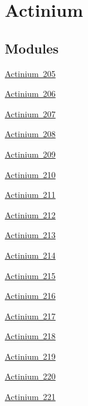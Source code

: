 \hypertarget{group___isotope_const-_actinium}{}\section{Actinium}
\label{group___isotope_const-_actinium}
\subsection*{Modules}
\begin{DoxyCompactItemize}
\item 
\mbox{\hyperlink{group___isotope_const-_actinium-_ac205}{Actinium 205}}
\item 
\mbox{\hyperlink{group___isotope_const-_actinium-_ac206}{Actinium 206}}
\item 
\mbox{\hyperlink{group___isotope_const-_actinium-_ac207}{Actinium 207}}
\item 
\mbox{\hyperlink{group___isotope_const-_actinium-_ac208}{Actinium 208}}
\item 
\mbox{\hyperlink{group___isotope_const-_actinium-_ac209}{Actinium 209}}
\item 
\mbox{\hyperlink{group___isotope_const-_actinium-_ac210}{Actinium 210}}
\item 
\mbox{\hyperlink{group___isotope_const-_actinium-_ac211}{Actinium 211}}
\item 
\mbox{\hyperlink{group___isotope_const-_actinium-_ac212}{Actinium 212}}
\item 
\mbox{\hyperlink{group___isotope_const-_actinium-_ac213}{Actinium 213}}
\item 
\mbox{\hyperlink{group___isotope_const-_actinium-_ac214}{Actinium 214}}
\item 
\mbox{\hyperlink{group___isotope_const-_actinium-_ac215}{Actinium 215}}
\item 
\mbox{\hyperlink{group___isotope_const-_actinium-_ac216}{Actinium 216}}
\item 
\mbox{\hyperlink{group___isotope_const-_actinium-_ac217}{Actinium 217}}
\item 
\mbox{\hyperlink{group___isotope_const-_actinium-_ac218}{Actinium 218}}
\item 
\mbox{\hyperlink{group___isotope_const-_actinium-_ac219}{Actinium 219}}
\item 
\mbox{\hyperlink{group___isotope_const-_actinium-_ac220}{Actinium 220}}
\item 
\mbox{\hyperlink{group___isotope_const-_actinium-_ac221}{Actinium 221}}
\item 

\end{DoxyCompactItemize}
